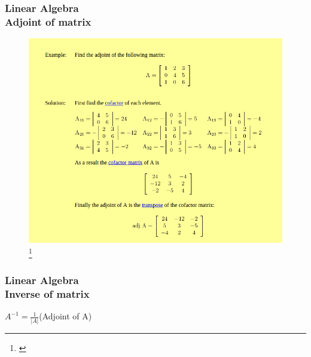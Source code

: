 \documentclass[hyperref={pdfpagelabels=true}]{beamer}
\begin{document}
\begin{frame}
\frametitle{Linear Algebra \\ {\large Adjoint of matrix}}
\begin{figure}[!tbp]
\centering
\includegraphics[scale = 0.35]{figs/Selection_013.png}
\footnote{\href{http://www.mathwords.com/a/adjoint.htm}{}}
\end{figure}
\end{frame}

\begin{frame}
\frametitle{Linear Algebra \\ {\large Inverse of matrix}}
\begin{center}
$A^{-1}=\frac{1}{|A|}$(Adjoint of A)
\end{center}
\end{frame}
\end{document}
